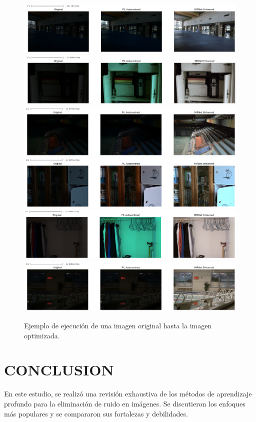\documentclass[a4paper,
               ]{jacow}
\begin{document}
\begin{figure}[!tbh]
    \centering
    \includegraphics*[width=.7\textwidth]{ll-1}
    \includegraphics*[width=.7\textwidth]{ll-2}
    \includegraphics*[width=.7\textwidth]{ll-3}
    \includegraphics*[width=.7\textwidth]{ll-4}
    \includegraphics*[width=.7\textwidth]{ll-5}
    \includegraphics*[width=.7\textwidth]{ll-6}
    \caption{Ejemplo de ejecución de una imagen original hasta la imagen optimizada.}
    \label{fig:ejem_procesamiento}
\end{figure}
 
\section{CONCLUSION}

En este estudio, se realizó una revisión exhaustiva de los métodos de aprendizaje profundo para la eliminación de ruido en imágenes. Se discutieron los enfoques más populares y se compararon sus fortalezas y debilidades.
\end{document}
